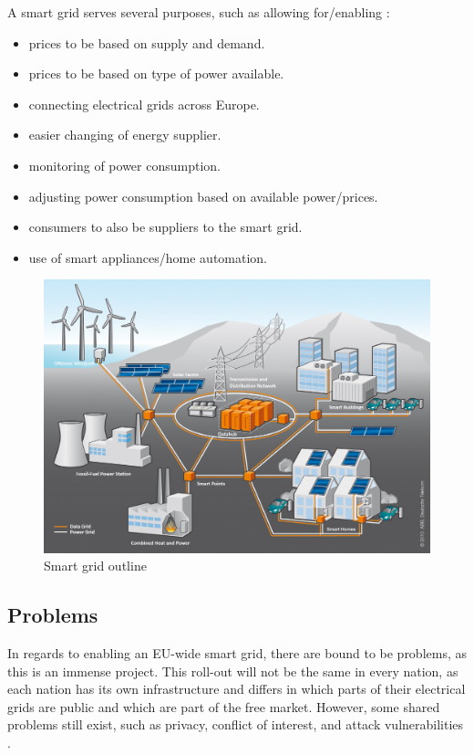 A smart grid serves several purposes, such as allowing for/enabling \cite{smartgrid_gov, directive_2009_72_EC}:
\begin{itemize}
	\item prices to be based on supply and demand.
	\item prices to be based on type of power available.
	\item connecting electrical grids across Europe.
	\item easier changing of energy supplier.
	\item monitoring of power consumption.
	\item adjusting power consumption based on available power/prices.
	\item consumers to also be suppliers to the smart grid.
	\item use of smart appliances/home automation.
\end{itemize}

\begin{figure}
	\includegraphics[width=\textwidth]{figures/SmartGrid_Ueberblick_ohneLegende.jpg}
	\caption{Smart grid outline\protect\footnotemark}
	\label{fig:background:smartgrid}
\end{figure}

\subsection{Problems}
In regards to enabling an EU-wide smart grid, there are bound to be problems, as this is an immense project.
This roll-out will not be the same in every nation, as each nation has its own infrastructure and differs in which parts of their electrical grids are public and which are part of the free market.
However, some shared problems still exist, such as privacy, conflict of interest, and attack vulnerabilities \cite{offswitch} \cite{smart_meter_survey} \cite{security_economics}.


